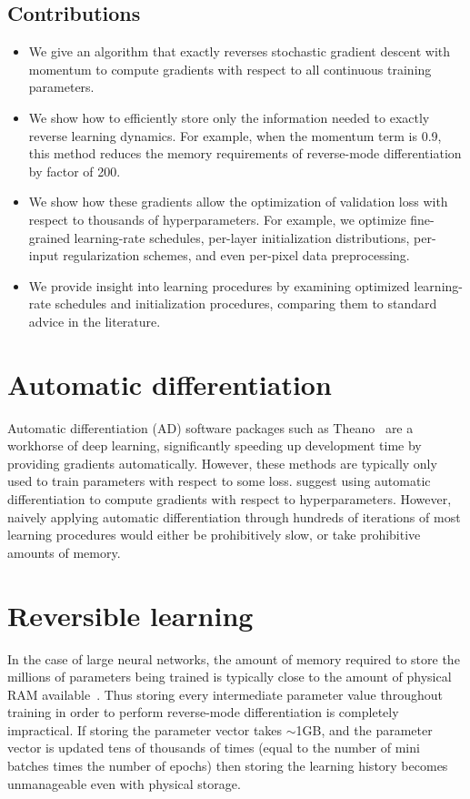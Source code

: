 \documentclass{article}
\begin{document}
\subsection{Contributions}

\begin{itemize}
\item We give an algorithm that exactly reverses stochastic gradient descent with momentum to compute gradients with respect to all continuous training parameters.
\item We show how to efficiently store only the information needed to exactly reverse learning dynamics.
For example, when the momentum term is 0.9, this method reduces the memory requirements of reverse-mode differentiation by factor of 200.
\item We show how these gradients allow the optimization of validation loss with respect to thousands of hyperparameters.
For example, we optimize fine-grained learning-rate schedules, per-layer initialization distributions, per-input regularization schemes, and even per-pixel data preprocessing.
\item We provide insight into learning procedures by examining optimized learning-rate schedules and initialization procedures, comparing them to standard advice in the literature.
\end{itemize}

\section{Automatic differentiation}

Automatic differentiation (AD) software packages such as Theano~\cite{Bastien-Theano-2012, bergstra2010scipy} are a workhorse of deep learning, significantly speeding up development time by providing gradients automatically.
However, these methods are typically only used to train parameters with respect to some loss.
\citet{Autodiff14} suggest using automatic differentiation to compute gradients with respect to hyperparameters.
However, naively applying automatic differentiation through hundreds of iterations of most learning procedures would either be prohibitively slow, or take prohibitive amounts of memory.

\section{Reversible learning}
\label{sec:reversible learning}

In the case of large neural networks, the amount of memory required to store the millions of parameters being trained is typically close to the amount of physical RAM available~\cite{sequence2014}.
Thus storing every intermediate parameter value throughout training in order to perform reverse-mode differentiation is completely impractical.
If storing the parameter vector takes $\sim$1GB, and the parameter vector is updated tens of thousands of times (equal to the number of mini batches times the number of epochs) then storing the learning history becomes unmanageable even with physical storage.
\end{document}

